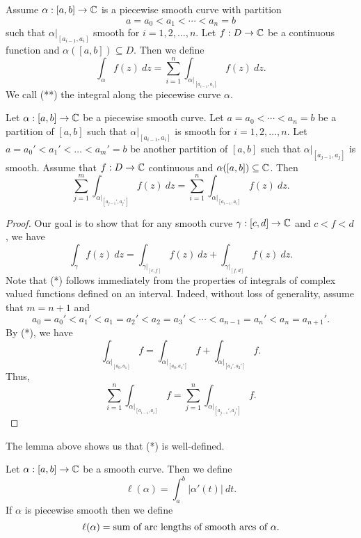 \documentclass[a4paper]{article}
\begin{document}
\begin{definition}
    Assume \( \alpha: [a,b] \to \mathbb{C}  \) is a piecewise smooth curve with partition
    \[  a = {a}_{0} < {a}_{1} < \cdots < {a}_{n} = b \]
    such that \( \alpha |_{[{a}_{i-1}, {a}_{i}]} \) smooth for \( i = 1,2,\dots, n \). Let \( f: D \to \mathbb{C}  \) be a continuous function and \( \alpha([a,b]) \subseteq D \). Then we define 
    \[  \int_{ \alpha }^{  } f(z) \ dz = \sum_{ i=1  }^{ n } \int_{ \alpha |_{[{a}_{i-1}, {a}_{i}]} }^{  }  f(z) \ dz. \tag{**} \]
    We call (**) the integral along the piecewise curve \( \alpha \).
\end{definition}

\begin{lemma}
    Let \( \alpha: [a,b] \to \mathbb{C}  \) be a piecewise smooth curve. Let \( a = {a}_{0} < \cdots < {a}_{n} = b \) be a partition of \( [a,b] \) such that \( \alpha |_{[{a}_{i-1}, {a}_{i}]} \) is smooth for \( i = 1,2,\dots, n \). Let \( a = {a}_{0}' < {a}_{1}' < \dots < {a}_{m}' = b \) be another partition of \( [a,b] \) such that \( \alpha  |_{[{a}_{j-1}, {a}_{j}]} \) is smooth. Assume that \( f: D \to \mathbb{C}  \) continuous and \( \alpha([a,b]) \subseteq  \mathbb{C}  \). Then
    \[  \sum_{ j=1  }^{ m } \int_{ \alpha |_{[{a}_{j-1}', {a}_{j}']} }^{  } f(z) \ dz = \sum_{ i=1  }^{ n } \int_{ \alpha |_{[{a}_{i-1}, {a}_{i}]} }^{  } f(z) \ dz.  \]
\end{lemma}

\begin{proof}
    Our goal is to show that for any smooth curve \( \gamma: [c,d] \to \mathbb{C}  \) and \( c < f < d  \), we have 
    \[  \int_{ \gamma }^{  } f(z)  \ dz = \int_{ \gamma |_{[c,f]} }^{  } f(z)  \ dz + \int_{ \gamma |_{[f,d]} }^{  } f(z) \ dz. \tag{\( \dagger \)} \]
    Note that (*) follows immediately from the properties of integrals of complex valued functions defined on an interval. Indeed, without loss of generality, assume that \( m = n + 1 \) and \[ {a}_{0} = {a}_{0}' < {a}_{1}' < {a}_{1} = {a}_{2}' < {a}_{2} = {a}_{3}' < \cdots < {a}_{n-1} = {a}_{n}' < {a}_{n} = {a}_{n+1}'.  \]
    By (*), we have 
    \[  \int_{ \alpha|_{[{a}_{0}, {a}_{1}]} }^{  }  f  = \int_{ \alpha |_{[{a}_{0}, {a}_{1}']} }^{  } f + \int_{ \alpha |_{[{a}_{1}', {a}_{2}']} }^{  } f. \]
    Thus, 
    \[  \sum_{ i=1  }^{ n } \int_{ \alpha |_{[{a}_{i-1}, {a}_{i}]} }^{  }  f  = \sum_{ j=1  }^{ n } \int_{ \alpha |_{[{a}_{j-1}', {a}_{j}']} }^{  }  f. \]
\end{proof}

The lemma above shows us that (*) is well-defined.

\begin{definition}
    Let \( \alpha: [a,b] \to \mathbb{C}  \) be a smooth curve. Then we define 
    \[  \ell(\alpha) = \int_{ a }^{ b } | \alpha'(t) |  \ dt.  \]
    If \( \alpha \) is piecewise smooth then we define \[ \ell(\alpha) = \text{sum of arc lengths of smooth arcs of \( \alpha \)}.   \]
\end{definition}
\end{document}

